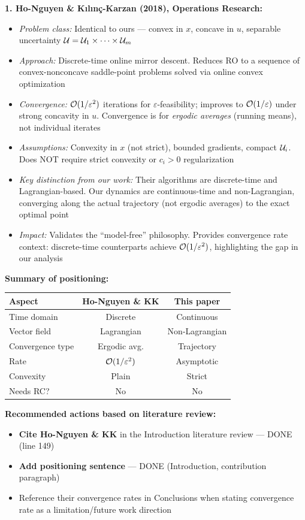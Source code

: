 \documentclass[journal,twoside,web]{ieeecolor}
\begin{document}
\textbf{1. Ho-Nguyen \& K{\i}l{\i}n\c{c}-Karzan (2018), Operations Research:}
\begin{itemize}
\item \textit{Problem class:} Identical to ours --- convex in $x$, concave in $u$, separable uncertainty ${\cal U} = {\cal U}_1 \times \cdots \times {\cal U}_m$
\item \textit{Approach:} Discrete-time online mirror descent. Reduces RO to a sequence of convex-nonconcave saddle-point problems solved via online convex optimization
\item \textit{Convergence:} ${\cal O}(1/\varepsilon^2)$ iterations for $\varepsilon$-feasibility; improves to ${\cal O}(1/\varepsilon)$ under strong concavity in $u$. Convergence is for \textit{ergodic averages} (running means), not individual iterates
\item \textit{Assumptions:} Convexity in $x$ (not strict), bounded gradients, compact ${\cal U}_i$. Does NOT require strict convexity or $c_i > 0$ regularization
\item \textit{Key distinction from our work:} Their algorithms are discrete-time and Lagrangian-based. Our dynamics are continuous-time and non-Lagrangian, converging along the actual trajectory (not ergodic averages) to the exact optimal point
\item \textit{Impact:} Validates the ``model-free'' philosophy. Provides convergence rate context: discrete-time counterparts achieve ${\cal O}(1/\varepsilon^2)$, highlighting the gap in our analysis
\end{itemize}

\textbf{Summary of positioning:}

\begin{tabular}{lcc}
\hline
\textbf{Aspect} & \textbf{Ho-Nguyen \& KK} & \textbf{This paper} \\
\hline
Time domain & Discrete & Continuous \\
Vector field & Lagrangian & Non-Lagrangian \\
Convergence type & Ergodic avg. & Trajectory \\
Rate & ${\cal O}(1/\varepsilon^2)$ & Asymptotic \\
Convexity & Plain & Strict \\
Needs RC? & No & No \\
\hline
\end{tabular}

\vspace{0.5em}

\textbf{Recommended actions based on literature review:}
\begin{itemize}
\item[\checkmark] {\color{ForestGreen}\textbf{Cite Ho-Nguyen \& KK}} in the Introduction literature review --- DONE (line 149)
\item[\checkmark] {\color{ForestGreen}\textbf{Add positioning sentence}} --- DONE (Introduction, contribution paragraph)
\item[$\square$] {\color{orange}Reference their convergence rates} in Conclusions when stating convergence rate as a limitation/future work direction
\end{itemize}
\end{document}
